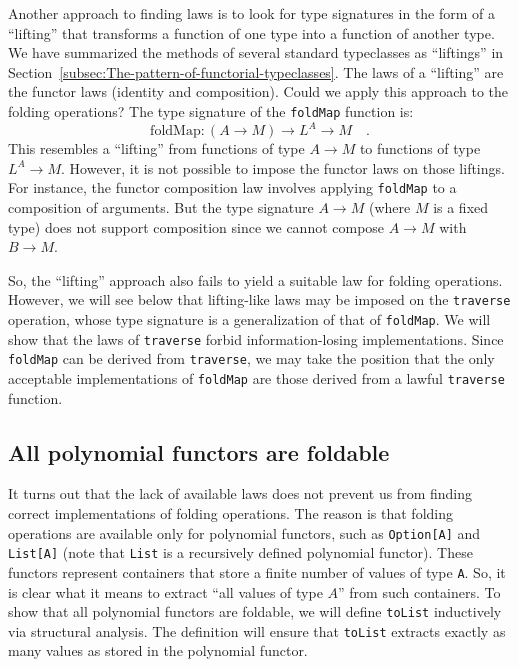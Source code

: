 Another approach to finding laws is to look for type signatures in
the form of a \textsf{``}lifting\textsf{''} that transforms a function of one type
into a function of another type. We have summarized the methods of
several standard typeclasses as \textsf{``}liftings\textsf{''} in Section~\ref{subsec:The-pattern-of-functorial-typeclasses}.
The laws of a \textsf{``}lifting\textsf{''} are the functor laws (identity and composition).
Could we apply this approach to the folding operations? The type signature
of the \lstinline!foldMap! function is:
\[
\text{foldMap}:\left(A\rightarrow M\right)\rightarrow L^{A}\rightarrow M\quad.
\]
This resembles a \textsf{``}lifting\textsf{''} from functions of type $A\rightarrow M$
to functions of type $L^{A}\rightarrow M$. However, it is not possible
to impose the functor laws on those liftings. For instance, the functor
composition law involves applying \lstinline!foldMap! to a composition
of arguments. But the type signature $A\rightarrow M$ (where $M$
is a fixed type) does not support composition since we cannot compose
$A\rightarrow M$ with $B\rightarrow M$.

So, the \textsf{``}lifting\textsf{''} approach also fails to yield a suitable law
for folding operations. However, we will see below that lifting-like
laws may be imposed on the \lstinline!traverse! operation, whose
type signature is a generalization of that of \lstinline!foldMap!.
We will show that the laws of \lstinline!traverse! forbid information-losing
implementations. Since \lstinline!foldMap! can be derived from \lstinline!traverse!,
we may take the position that the only acceptable implementations
of \lstinline!foldMap! are those derived from a lawful \lstinline!traverse!
function.

\subsection{All polynomial functors are foldable}

It turns out that the lack of available laws does not prevent us from
finding correct implementations of folding operations. The reason
is that folding operations are available only for polynomial functors,
such as \lstinline!Option[A]! and \lstinline!List[A]! (note that
\lstinline!List! is a recursively defined polynomial functor).
These functors represent containers that store a finite number of
values of type \lstinline!A!. So, it is clear what it means to extract
\textsf{``}all values of type $A$\textsf{''} from such containers. To show that all
polynomial functors are foldable, we will define \lstinline!toList!
inductively via structural analysis. The definition will ensure that
\lstinline!toList! extracts exactly as many values as stored in the
polynomial functor.

